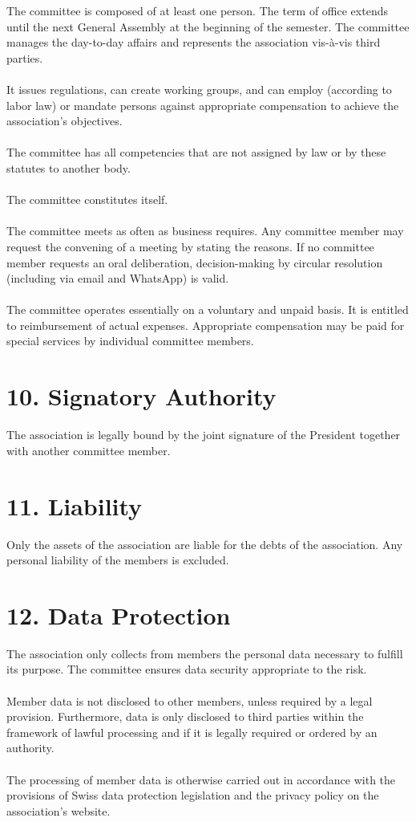 \documentclass[11pt,a4paper]{article}
\begin{document}
The committee is composed of at least one person. The term of office extends until the next General Assembly at the beginning of the semester. The committee manages the day-to-day affairs and represents the association vis-à-vis third parties.
\\\\
It issues regulations, can create working groups, and can employ (according to labor law) or mandate persons against appropriate compensation to achieve the association's objectives.
\\\\
The committee has all competencies that are not assigned by law or by these statutes to another body.
\\\\
The committee constitutes itself.
\\\\
The committee meets as often as business requires. Any committee member may request the convening of a meeting by stating the reasons. If no committee member requests an oral deliberation, decision-making by circular resolution (including via email and WhatsApp) is valid.
\\\\
The committee operates essentially on a voluntary and unpaid basis. It is entitled to reimbursement of actual expenses. Appropriate compensation may be paid for special services by individual committee members.

\section*{10. Signatory Authority}

The association is legally bound by the joint signature of the President together with another committee member.

\section*{11. Liability}

Only the assets of the association are liable for the debts of the association. Any personal liability of the members is excluded.

\section*{12. Data Protection}

The association only collects from members the personal data necessary to fulfill its purpose. The committee ensures data security appropriate to the risk.
\\\\
Member data is not disclosed to other members, unless required by a legal provision. Furthermore, data is only disclosed to third parties within the framework of lawful processing and if it is legally required or ordered by an authority.
\\\\
The processing of member data is otherwise carried out in accordance with the provisions of Swiss data protection legislation and the privacy policy on the association's website.
\end{document}
